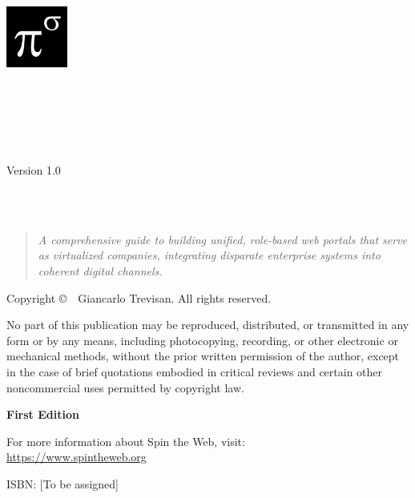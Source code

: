 \begin{titlepage}
\centering

\includegraphics[width=0.15\textwidth]{figures/logo.png}\\[1cm]

\vspace*{1cm}

\makeatletter
{\Huge\bfseries \@title\\[0.5cm]}

\ifx\@subtitle\@empty\else
{\Large \@subtitle\\[1.5cm]}
\fi

{\large\textsc{\@author}\\[2cm]}

{\large Version 1.0\\[0.5cm]}
{\large \@date\\[2cm]}
\makeatother

\vfill

{\large \organization\\[0.5cm]}

\begin{quote}
\centering
\textit{A comprehensive guide to building unified, role-based web portals that serve as virtualized companies, integrating disparate enterprise systems into coherent digital channels.}
\end{quote}

\end{titlepage}

\thispagestyle{empty}
\null\vfill
\noindent
\thispagestyle{empty}
\vspace*{\fill}
\begin{center}
\small
Copyright \copyright\ \the\year\ Giancarlo Trevisan. All rights reserved.

\medskip

\noindent
No part of this publication may be reproduced, distributed, or transmitted in any form or by any means, including photocopying, recording, or other electronic or mechanical methods, without the prior written permission of the author, except in the case of brief quotations embodied in critical reviews and certain other noncommercial uses permitted by copyright law.

\medskip

\noindent
\textbf{First Edition}

\medskip

\noindent
For more information about Spin the Web, visit: \\
\url{https://www.spintheweb.org}

\medskip

\noindent
ISBN: [To be assigned]
\end{center}

\clearpage
